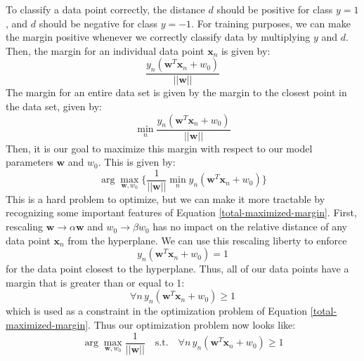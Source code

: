 To classify a data point correctly, the distance $d$ should be positive for class $y = 1$, and $d$ should be negative for class $y = -1$. For training purposes, we can make the margin positive whenever we correctly classify data by multiplying $y$ and $d$. Then, the margin for an individual data point $\textbf{x}_{n}$ is given by:
\begin{equation} \label{individual-margin}
	\frac{y_{n}(\textbf{w}^{T}\textbf{x}_{n} + w_{0})}{||\textbf{w}||}
\end{equation}
The margin for an entire data set is given by the margin to the closest point in the data set, given by:
\begin{equation} \label{total-margin}
	\min_{n} \frac{y_{n}(\textbf{w}^{T}\textbf{x}_{n} + w_{0})}{||\textbf{w}||}
\end{equation}
Then, it is our goal to maximize this margin with respect to our model parameters $\textbf{w}$ and $w_{0}$. This is given by:
\begin{equation} \label{total-maximized-margin}
	\arg\max_{\textbf{w}, w_{0}} \big\{ \frac{1}{||\textbf{w}||} \min_{n} y_{n}(\textbf{w}^{T}\textbf{x}_{n} + w_{0}) \big\}
\end{equation}
This is a hard problem to optimize, but we can make it more tractable by recognizing some important features of Equation \ref{total-maximized-margin}. First, rescaling $\textbf{w} \rightarrow \alpha \textbf{w}$ and $w_{0} \rightarrow \beta w_{0}$ has no impact on the relative distance of any data point $\textbf{x}_{n}$ from the hyperplane. We can use this rescaling liberty to enforce
\begin{equation} \label{enfore-dist-to-1}
	y_{n}(\textbf{w}^{T}\textbf{x}_{n} + w_{0}) = 1
\end{equation}
for the data point closest to the hyperplane. Thus, all of our data points have a margin that is greater than or equal to 1:
\begin{equation} \label{new-margin-constraint}
	\forall n \, y_{n}(\textbf{w}^{T}\textbf{x}_{n} + w_{0}) \geq 1
\end{equation}
which is used as a constraint in the optimization problem of Equation \ref{total-maximized-margin}. Thus our optimization problem now looks like:
\begin{equation} \label{simplified-maximized-margin-optimization}
	\arg\max_{\textbf{w}, w_{0}} \frac{1}{||\textbf{w}||} \quad \text{s.t.} \quad \forall n \, y_{n}(\textbf{w}^{T}\textbf{x}_{n} + w_{0}) \geq 1
\end{equation}
